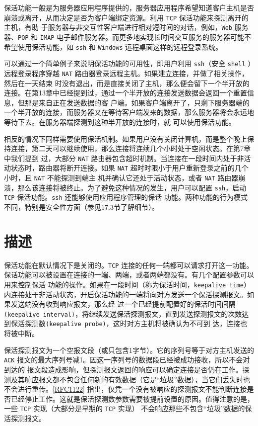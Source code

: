 保活功能一般是为服务器应用程序提供的，服务器应用程序希望知道客户主机是否崩溃或离开，从而决定是否为客户端绑定资源。利用 \verb|TCP| 保活功能来探测离开的主机，有助
于服务器与非交互性客户端进行相对短时间的对话，例如，\verb|Web| 服务器、\verb|POP| 和 \verb|IMAP| 电子邮件服务器。而更多地实现长时间交互服务的服务器可能不希望使用保活功能，如 \verb|ssh| 和
\verb|Windows| 远程桌面这样的远程登录系统。

可以通过一个简单例子来说明保活功能的可用性，即用户利用 \verb|ssh|（安全 \verb|shell| ）远程登录程序穿越 \verb|NAT| 路由器登录远程主机。如果建立连接，并做了相关操作，然后在一天结束
时没有退出，而是直接关闭了主机，那么便会留下一个半开放的连接。在第13章中已经提到过，通过一个半开放的连接发送数据会返回一个重置信息，但那是来自正在发送数据的客
户端。如果客户端离开了，只剩下服务器端的一个半开放的连接，而服务器又在等待客户端发来的数据，那么服务器将会永远地等待下去。在服务器端探测到这种半开放的连接时，就
可以使用保活功能。

相反的情况下同样需要使用保活机制。如果用户没有关闭计算机，而是整个晚上保持连接，第二天可以继续使用，那么连接将连续几个小时处于空闲状态。在第7章中我们提到
过，大部分 \verb|NAT| 路由器包含超时机制。当连接在一段时间内处于非活动状态时，路由器将断开连接。如果 \verb|NAT| 超时时限小于用户重新登录之前的几个小时，且 \verb|NAT| 不能探测到端主
机并确认它还处于活动状态，或者 \verb|NAT| 路由器崩溃，那么该连接将被终止。为了避免这种情况的发生，用户可以配置 \verb|ssh|，启动 \verb|TCP| 保活功能。\verb|ssh| 还能够使用应用程序管理的保话
功能。两种功能的行为模式不同，特别是安全性方面（参见17.3节了解细节）。

\section{描述}
保活功能在默认情况下是关闭的。\verb|TCP| 连接的任何一端都可以请求打开这一功能。保话功能可以被设置在连接的一端、两端，或者两端都没有。有几个配置参数可以用来控制保活
功能的操作。如果在一段时间（称为保活时间，\verb|keepalive time|）内连接处于非活动状态，开启保活功能的一端将向对方发送一个保活探测报文。如果发送端没有收到响应报文，那么经
过一个已经提前配置好的保活时间间隔\verb|(keepalive interval)|，将继续发送保活探测报文，直到发送探测报文的次数达到保活探测数\verb|(keepalive probe)|，这时对方主机将被确认为不可到
达，连接也将被中断。

保活探测报文为一个空报文段（或只包含1字节）。它的序列号等于对方主机发送的 \verb|ACK| 报文的最大序列号减1。因这一序列号的数据段已经被成功接收，所以不会对到达的
报文段造成影响，但探测报文返回的响应可以确定连接是否仍在工作。探测及其响应报文都不包含任何新的有效数据（它是“垃圾”数据），当它们丢失时也不会进行重传。\href{https://www.rfc-editor.org/rfc/rfc1122}{[RFC1122]}
指出，仅凭一个没有被响应的探测报文不能判断连接是否已经停止工作。这就是保活探测数参数需要被提前设置的原因。值得注意的是，一些 \verb|TCP| 实现（大部分是早期的 \verb|TCP| 实现）
不会响应那些不包含“垃圾”数据的保活探测报文。

